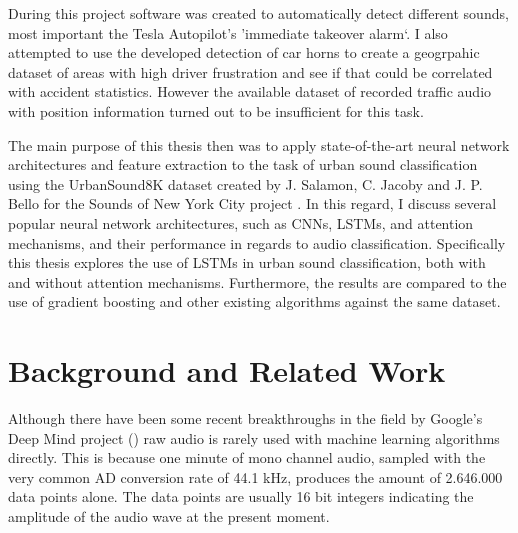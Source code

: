 During this project software was created to automatically detect different sounds, most important the Tesla Autopilot's 'immediate takeover alarm`. I also attempted to use the developed detection of car horns to create a geogrpahic dataset of areas with high driver frustration and see if that could be correlated with accident statistics. However the available dataset of recorded traffic audio with position information turned out to be insufficient for this task.

The main purpose of this thesis then was to apply state-of-the-art neural network architectures and feature extraction to the task of urban sound classification using the UrbanSound8K dataset created by J. Salamon, C. Jacoby and J. P. Bello for the Sounds of New York City project \cite{Salamon:UrbanSound:ACMMM:14}. In this regard, I discuss several popular neural network architectures, such as CNNs, LSTMs, and attention mechanisms, and their performance in regards to audio classification. Specifically this thesis explores the use of LSTMs in urban sound classification, both with and without attention mechanisms. Furthermore, the results are compared to the use of gradient boosting and other existing algorithms against the same dataset.




\chapter{Background and Related Work}
\label{Background and Related Work}

Although there have been some recent breakthroughs in the field by Google's Deep Mind project (\cite{DBLP:journals/corr/OordDZSVGKSK16}) raw audio is rarely used  with machine learning algorithms directly. This is because one minute of mono channel audio, sampled with the very common AD conversion rate of 44.1 kHz, produces the amount of 2.646.000 data points alone. The data points are usually 16 bit integers indicating the amplitude of the audio wave at the present moment.


